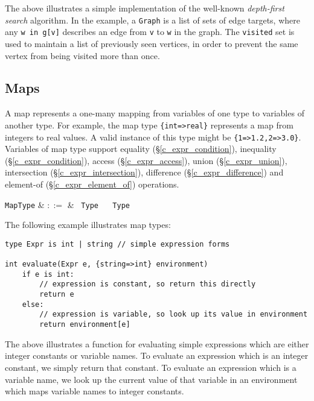 The above illustrates a simple implementation of the well-known {\em depth-first search} algorithm.  In the example, a \lstinline{Graph} is a list of sets of edge targets, where any \lstinline{w in g[v]} describes an edge from \lstinline{v} to \lstinline{w} in the graph.  The \lstinline{visited} set is used to maintain a list of previously seen vertices, in order to prevent the same vertex from being visited more than once.  


\subsection{Maps}
\label{c_types_map}

A map represents a one-many mapping from variables of one type to variables of another type. For example, the map type \lstinline|{int=>real}| represents a map from integers to real values. A valid instance of this type might be \lstinline|{1=>1.2,2=>3.0}|.  Variables of map type support equality (\S\ref{c_expr_condition}), inequality (\S\ref{c_expr_condition}), access (\S\ref{c_expr_access}), union (\S\ref{c_expr_union}), intersection (\S\ref{c_expr_intersection}), difference (\S\ref{c_expr_difference}) and element-of (\S\ref{c_expr_element_of}) operations.

\begin{syntax}
  \verb+MapType+ & $::=$ & \token{\{} \ \verb+Type+ \ \token{=>} \ \verb+Type+ \ \token{\}} \\
\end{syntax}

\noindent The following example illustrates map types:

\begin{lstlisting}
type Expr is int | string // simple expression forms

int evaluate(Expr e, {string=>int} environment)
    if e is int:
        // expression is constant, so return this directly
        return e
    else:
        // expression is variable, so look up its value in environment
        return environment[e]
\end{lstlisting}

The above illustrates a function for evaluating simple expressions which are either integer constants or variable names.  To evaluate an expression which is an integer constant, we simply return that constant.  To evaluate an expression which is a variable name, we look up the current value of that variable in an environment which maps variable names to integer constants.

